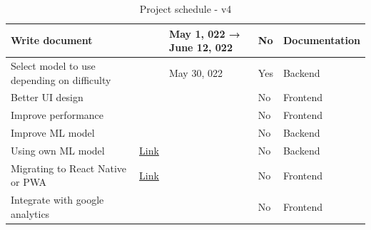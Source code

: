 \begin{table}[H]
{\begin{tabular}{|l|l|l|l|l|}
        \hline Write document &  & May 1, 022 → June 12, 022 & No & Documentation \\
        \hline Select model to use depending on difficulty &  & May 30, 022 & Yes & Backend \\
        \hline Better UI design &  &  & No & Frontend \\
        \hline Improve performance &  &  & No & Frontend \\
        \hline Improve ML model &  &  & No & Backend \\
        \hline Using own ML model & \href{https://github.com/JesusGonzalezA/LearnASL/milestone/10}{Link} &  & No & Backend \\
        \hline Migrating to React Native or PWA & \href{https://github.com/JesusGonzalezA/LearnASL/milestone/9}{Link} &  & No & Frontend \\
        \hline Integrate with google analytics &  &  & No & Frontend \\
        \hline
    \end{tabular}
    }
\caption{Project schedule - v4}
\label{table:planification_real_v4}
\end{table}


